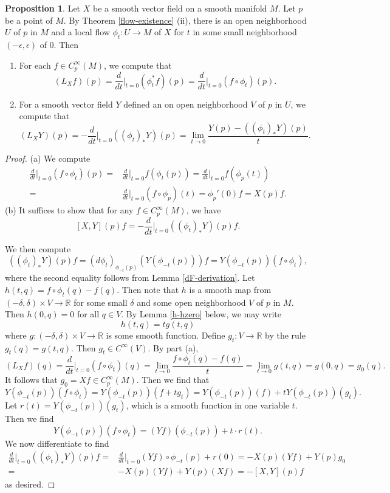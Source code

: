 \documentclass{amsart}
\numberwithin{equation}{section}
\newcommand{\bR}{\mathbb{R}}
\theoremstyle{definition}
\theoremstyle{theorem}
\newtheorem{proposition}[definition]{Proposition}
\begin{document}
\begin{proposition}
Let $X$ be a smooth vector field on a smooth manifold $M$. Let $p$ be a point of $M$. 
By Theorem \ref{flow-existence} (ii), there is an open neighborhood $U$ of $p$ in $M$ and a local 
flow $\phi_t : U \to M$ of $X$ for $t$ in some small neighborhood $(-\epsilon, \epsilon)$ of $0$. Then 
\begin{enumerate}
\item[(a)] For each $f \in C_p^\infty(M)$, we compute that 
\[
(L_Xf)(p) = \frac{d}{dt}\Big|_{t=0} (\phi_t^*f)(p) = \frac{d}{dt}\Big|_{t=0}  (f \circ \phi_t)(p).
\]
\item[(b)] For a smooth vector field $Y$ defined an on open neighborhood $V$ of $p$ in $U$, we compute that 
\[
(L_XY)(p) = - \frac{d}{dt}\Big|_{t=0}((\phi_t)_*Y)(p) = \lim_{t\to 0}\frac{Y(p) - ((\phi_t)_*Y)(p)}{t}.
\]
\end{enumerate}
\end{proposition}

\begin{proof}
(a) We compute 
\begin{align*}
\frac{d}{dt}\Big|_{t=0} (f \circ \phi_t)(p) =& \frac{d}{dt}\Big|_{t=0} f(\phi_t(p)) = \frac{d}{dt}\Big|_{t=0} f(\phi_p(t)) \\
= & \frac{d}{dt}\Big|_{t=0} (f \circ \phi_p)(t) = \phi_p'(0)f = X(p)f.
\end{align*}
(b) It suffices to show that for any $f \in C_p^\infty(M)$, we have 
\[
[X,Y](p)f = - \frac{d}{dt}\Big|_{t=0} ((\phi_t)_* Y)(p)f.
\]

We then compute 
$$
((\phi_t)_* Y)(p)f  = (d\phi_t)_{\phi_{-t}(p)} (Y(\phi_{-t}(p)))f 
= Y(\phi_{-t}(p))(f \circ \phi_t),
$$
where the second equality follows from Lemma \ref{dF-derivation}.
Let $h(t,q) = f \circ \phi_t(q) - f(q)$. Then note that $h$ is a smooth map from $(-\delta, \delta) \times V \to \mathbb{R}$ for some small $\delta$ and some open neighborhood $V$ of $p$ in $M$. Then $h(0,q) = 0$ for all $q \in V$. By Lemma \ref{h-hzero} below, we may write 
\[
h(t,q) = tg(t,q)
\]
where $g : (-\delta, \delta) \times V \to \mathbb{R}$ is some smooth function. 
Define $g_t : V \to \bR$ by the rule $g_t(q) = g(t,q)$. Then $g_t\in C^\infty(V)$. 
By part (a), 
\[
(L_Xf)(q) = \frac{d}{dt}\Big|_{t=0} (f \circ \phi_t)(q) =
\lim_{t\to 0}\frac{f\circ\phi_t(q)-f(q)}{t}= \lim_{t\to 0} g(t,q)= g(0,q)=g_0(q).
\]
It follows that $g_0 = Xf \in C_p^\infty(M)$. Then we find that 
$$
Y(\phi_{-t}(p))(f \circ \phi_t) = Y(\phi_{-t}(p))(f + tg_t) 
= Y(\phi_{-t}(p))(f) + tY(\phi_{-t}(p))(g_t).
$$
Let $r(t) = Y(\phi_{-t}(p))(g_t)$, which is a smooth function in one variable $t$. Then we find 
$$
Y(\phi_{-t}(p))(f \circ \phi_t) = (Yf)(\phi_{-t}(p)) + t\cdot r(t). 
$$
We now differentiate to find 
\begin{align*}
\frac{d}{dt}\Big|_{t=0} ((\phi_t)_*Y)(p)f =& \frac{d}{dt}\Big|_{t=0} (Yf)\circ \phi_{-t}(p) + r(0) =  -X(p)(Yf) + Y(p)g_0 \\
=& -X(p)(Yf) + Y(p)(Xf) = -[X,Y](p)f
\end{align*}
as desired. 
\end{proof}
\end{document}
